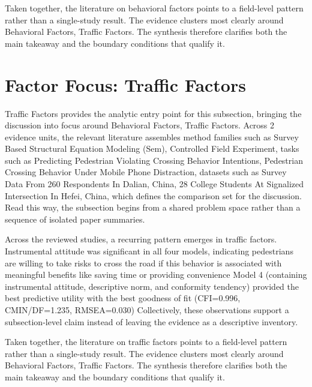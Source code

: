 \documentclass{article}
\begin{document}
Taken together, the literature on behavioral factors points to a field-level pattern rather than a single-study result. The evidence clusters most clearly around Behavioral Factors, Traffic Factors. The synthesis therefore clarifies both the main takeaway and the boundary conditions that qualify it. \cite{08_2016_zhou_aap,09_2018_jiang_aap}

\section{Factor Focus: Traffic Factors}
Traffic Factors provides the analytic entry point for this subsection, bringing the discussion into focus around Behavioral Factors, Traffic Factors. Across 2 evidence units, the relevant literature assembles method families such as Survey Based Structural Equation Modeling (Sem), Controlled Field Experiment, tasks such as Predicting Pedestrian Violating Crossing Behavior Intentions, Pedestrian Crossing Behavior Under Mobile Phone Distraction, datasets such as Survey Data From 260 Respondents In Dalian, China, 28 College Students At Signalized Intersection In Hefei, China, which defines the comparison set for the discussion. Read this way, the subsection begins from a shared problem space rather than a sequence of isolated paper summaries. \cite{08_2016_zhou_aap,09_2018_jiang_aap}

Across the reviewed studies, a recurring pattern emerges in traffic factors. Instrumental attitude was significant in all four models, indicating pedestrians are willing to take risks to cross the road if this behavior is associated with meaningful benefits like saving time or providing convenience Model 4 (containing instrumental attitude, descriptive norm, and conformity tendency) provided the best predictive utility with the best goodness of fit (CFI=0.996, CMIN/DF=1.235, RMSEA=0.030) Collectively, these observations support a subsection-level claim instead of leaving the evidence as a descriptive inventory. \cite{08_2016_zhou_aap,09_2018_jiang_aap}

Taken together, the literature on traffic factors points to a field-level pattern rather than a single-study result. The evidence clusters most clearly around Behavioral Factors, Traffic Factors. The synthesis therefore clarifies both the main takeaway and the boundary conditions that qualify it. \cite{08_2016_zhou_aap,09_2018_jiang_aap}
\end{document}
